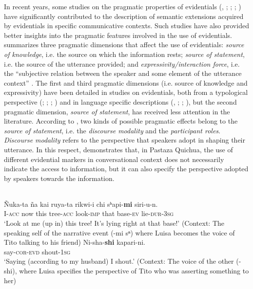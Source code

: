 \documentclass[output=paper]{langsci/langscibook}
\begin{document}
In recent years, some studies on the pragmatic properties of evidentials (\citealt{Curnow2002b}, \citeyear{Curnow2003}; \citealt{Clift2006}; \citealt{Faller2006};  \citealt{Hengeveld2015}) have significantly contributed to the description of semantic extensions acquired by evidentials in specific communicative contexts. Such studies have also provided better insights into the pragmatic features involved in the use of evidentials. \citet[172]{Hanks2012} summarizes three pragmatic dimensions that affect the use of evidentials: \textit{source of knowledge}, i.e. the source on which the information rests; \textit{source of statement}, i.e. the source of the utterance provided; and \textit{expressivity/interaction force}, i.e. the “subjective relation between the speaker and some element of the utterance context” \citep[174]{Hanks2012}. The first and third pragmatic dimensions (i.e. source of knowledge and expressivity) have been detailed in studies on evidentials, both from a typological perspective (\citealt{Willett1988}; \citealt{DeLancey1997}; \citealt{Plungian2001}; \citealt{Aikhenvald2004}) and in language specific descriptions (\citealt{Curnow2002b}, \citeyear{Curnow2003}; \citealt{Clift2006}; \citealt{Babel2009}), but the second pragmatic dimension, \textit{source of statement}, has received less attention in the literature. According to \citet[174]{Hanks2012}, two kinds of possible pragmatic effects belong to the \textit{source of statement}, i.e. the \textit{discourse modality} and the \textit{participant roles}. \textit{Discourse modality} refers to the perspective that speakers adopt in shaping their utterance. In this respect, \citet{Nuckolls2012} demonstrates that, in Pastaza Quichua, the use of different evidential markers in conversational context does not necessarily indicate the access to information, but it can also specify the perspective adopted by speakers towards the information.


\ea \label{ex:gq11}
\\
	\ea \label{ex:gq11a}
		\gll Ñuka-ta ña kai ruya-ta rikwi-i chi sʰapi-\textbf{mi} siri-u-n.\\
	I-\textsc{acc} now this tree-\textsc{acc} look-\textsc{imp} that base-\textsc{ev} lie-\textsc{dur-3sg}\\
	\glt ‘Look at me (up in) this tree! It’s lying right at that base!’ (Context: The speaking self of the narrative event (-mi sⁿ) where Luisa becomes the voice of Tito talking to his friend)
	\ex \label{ex:gq11b}
	\gll Ni-sha-\textbf{shi} kapari-ni.\\
	say-\textsc{cor-evd} shout-\textsc{1sg}\\
	\glt ‘Saying (according to my husband) I shout.’ (Context: The voice of the other (-shi), where Luisa specifies the perspective of Tito who was asserting something to her)
	\z
\z
\end{document}
